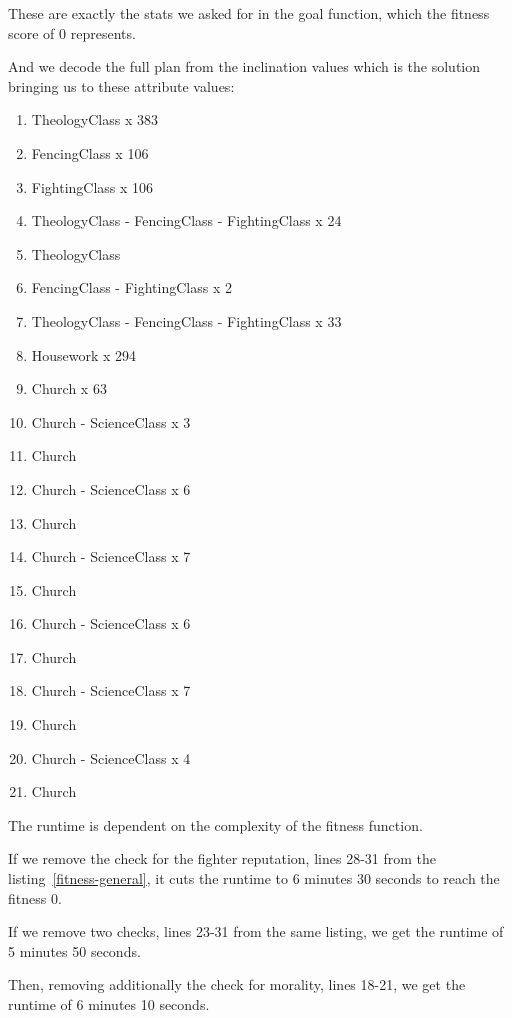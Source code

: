 \documentclass[12pt, a4paper]{report}
\begin{document}
	These are exactly the stats we asked for in the goal function, which the fitness score of 0 represents.
	
	And we decode the full plan from the inclination values which is the solution bringing us to these attribute values:
	
	\begin{enumerate}
		\item TheologyClass x 383
		\item FencingClass x 106
		\item FightingClass x 106

		\item TheologyClass - FencingClass - FightingClass x 24
	
		\item TheologyClass
		\item FencingClass - FightingClass x 2

		\item TheologyClass - FencingClass - FightingClass x 33

		\item Housework x 294
		\item Church x 63
		\item Church - ScienceClass x 3
		\item Church
		\item Church - ScienceClass x 6
		\item Church
		\item Church - ScienceClass x 7
		\item Church
		\item Church - ScienceClass x 6
		\item Church
		\item Church - ScienceClass x 7
		\item Church
		\item Church - ScienceClass x 4
		\item Church
	\end{enumerate}
	
	The runtime is dependent on the complexity of the fitness function.
	
	If we remove the check for the fighter reputation, lines 28-31 from the listing~\ref{fitness-general},
	it cuts the runtime to 6 minutes 30 seconds to reach the fitness 0.
	
	If we remove two checks, lines 23-31 from the same listing, we get the runtime of 5 minutes 50 seconds.
	
	Then, removing additionally the check for morality, lines 18-21, we get the runtime of 6 minutes 10 seconds.
	
\end{document}
